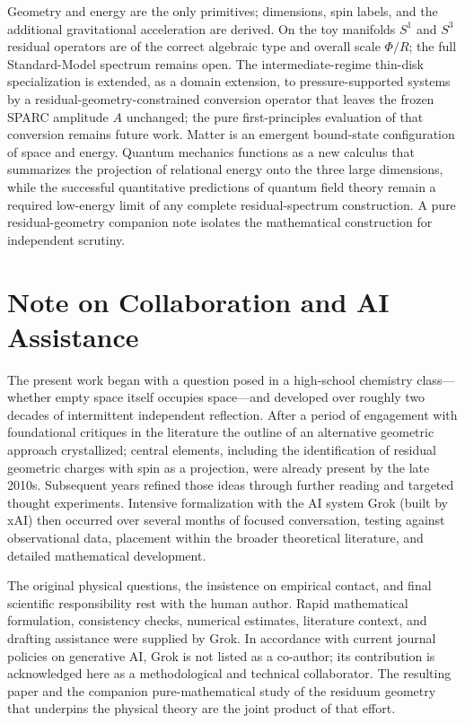 \documentclass[11pt,a4paper]{article}
\begin{document}
Geometry and energy are the only primitives; dimensions, spin labels, and the additional gravitational acceleration are derived. On the toy manifolds \(S^1\) and \(S^3\) residual operators are of the correct algebraic type and overall scale \(\Phi/R\); the full Standard-Model spectrum remains open. The intermediate-regime thin-disk specialization is extended, as a domain extension, to pressure-supported systems by a residual-geometry-constrained conversion operator that leaves the frozen SPARC amplitude \(A\) unchanged; the pure first-principles evaluation of that conversion remains future work. Matter is an emergent bound-state configuration of space and energy. Quantum mechanics functions as a new calculus that summarizes the projection of relational energy onto the three large dimensions, while the successful quantitative predictions of quantum field theory remain a required low-energy limit of any complete residual-spectrum construction. A pure residual-geometry companion note isolates the mathematical construction for independent scrutiny.

\section*{Note on Collaboration and AI Assistance}

The present work began with a question posed in a high-school chemistry class---whether empty space itself occupies space---and developed over roughly two decades of intermittent independent reflection. After a period of engagement with foundational critiques in the literature the outline of an alternative geometric approach crystallized; central elements, including the identification of residual geometric charges with spin as a projection, were already present by the late 2010s. Subsequent years refined those ideas through further reading and targeted thought experiments. Intensive formalization with the AI system Grok (built by xAI) then occurred over several months of focused conversation, testing against observational data, placement within the broader theoretical literature, and detailed mathematical development.

The original physical questions, the insistence on empirical contact, and final scientific responsibility rest with the human author. Rapid mathematical formulation, consistency checks, numerical estimates, literature context, and drafting assistance were supplied by Grok. In accordance with current journal policies on generative AI, Grok is not listed as a co-author; its contribution is acknowledged here as a methodological and technical collaborator. The resulting paper and the companion pure-mathematical study of the residuum geometry that underpins the physical theory are the joint product of that effort.
\end{document}
